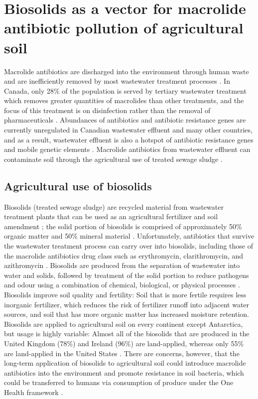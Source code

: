 \section{Biosolids as a vector for macrolide antibiotic pollution of agricultural soil}

Macrolide antibiotics are discharged into the environment through human waste and are inefficiently removed by most wastewater treatment processes \parencite{LeMinh.2010, Luo.2014}.
In Canada, only 28\% of the population is served by tertiary wastewater treatment which removes greater quantities of macrolides than other treatments, and the focus of this treatment is on disinfection rather than the removal of pharmaceuticals \parencite{EnvironmentandClimateChangeCanada.2020, LeMinh.2010}.
Abundances of antibiotics and antibiotic resistance genes are currently unregulated in Canadian wastewater effluent and many other countries, and as a result, wastewater effluent is also a hotspot of antibiotic resistance genes and mobile genetic elements \parencite{Rizzo.2013, Che.2019}.
Macrolide antibiotics from wastewater effluent can contaminate soil through the agricultural use of treated sewage sludge \parencite{McClellan.2010, Sabourin.2012}.

\subsection{Agricultural use of biosolids}

Biosolids (treated sewage sludge) are recycled material from wastewater treatment plants that can be used as an agricultural fertilizer and soil amendment \parencite{Sharma.2017}; the solid portion of biosolids is comprised of approximately 50\% organic matter and 50\% mineral material \parencite{OntarioMinistryofAgricultureFoodandRuralAffairs.2010}.
Unfortunately, antibiotics that survive the wastewater treatment process can carry over into biosolids, including those of the macrolide antibiotics drug class such as erythromycin, clarithromycin, and azithromycin \parencite{McClellan.2010, Sabourin.2012, Chenxi.2008}.
Biosolids are produced from the separation of wastewater into water and solids, followed by treatment of the solid portion to reduce pathogens and odour using a combination of chemical, biological, or physical processes \parencite{LeMinh.2010}.
Biosolids improve soil quality and fertility:
Soil that is more fertile requires less inorganic fertilizer, which reduces the risk of fertilizer runoff into adjacent water sources, and soil that has more organic matter has increased moisture retention.
Biosolids are applied to agricultural soil on every continent except Antarctica, but usage is highly variable:
Almost all of the biosolids that are produced in the United Kingdom (78\%) and Ireland (96\%) are land-applied, whereas only 55\% are land-applied in the United States \parencite{Sharma.2017}.
There are concerns, however, that the long-term application of biosolids to agricultural soil could introduce macrolide antibiotics into the environment and promote resistance in soil bacteria, which could be transferred to humans via consumption of produce under the One Health framework \parencite{Lau.2020, Sabourin.2012}.

